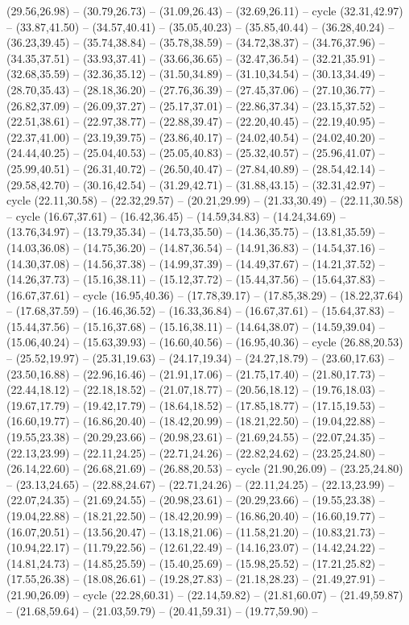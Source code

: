 {(29.56,26.98) -- (30.79,26.73) -- (31.09,26.43) -- (32.69,26.11) -- cycle (32.31,42.97) -- (33.87,41.50) -- (34.57,40.41) -- (35.05,40.23) -- (35.85,40.44) -- (36.28,40.24) -- (36.23,39.45) -- (35.74,38.84) -- (35.78,38.59) -- (34.72,38.37) -- (34.76,37.96) -- (34.35,37.51) -- (33.93,37.41) -- (33.66,36.65) -- (32.47,36.54) -- (32.21,35.91) -- (32.68,35.59) -- (32.36,35.12) -- (31.50,34.89) -- (31.10,34.54) -- (30.13,34.49) -- (28.70,35.43) -- (28.18,36.20) -- (27.76,36.39) -- (27.45,37.06) -- (27.10,36.77) -- (26.82,37.09) -- (26.09,37.27) -- (25.17,37.01) -- (22.86,37.34) -- (23.15,37.52) -- (22.51,38.61) -- (22.97,38.77) -- (22.88,39.47) -- (22.20,40.45) -- (22.19,40.95) -- (22.37,41.00) -- (23.19,39.75) -- (23.86,40.17) -- (24.02,40.54) -- (24.02,40.20) -- (24.44,40.25) -- (25.04,40.53) -- (25.05,40.83) -- (25.32,40.57) -- (25.96,41.07) -- (25.99,40.51) -- (26.31,40.72) -- (26.50,40.47) -- (27.84,40.89) -- (28.54,42.14) -- (29.58,42.70) -- (30.16,42.54) -- (31.29,42.71) -- (31.88,43.15) -- (32.31,42.97) -- cycle (22.11,30.58) -- (22.32,29.57) -- (20.21,29.99) -- (21.33,30.49) -- (22.11,30.58) -- cycle (16.67,37.61) -- (16.42,36.45) -- (14.59,34.83) -- (14.24,34.69) -- (13.76,34.97) -- (13.79,35.34) -- (14.73,35.50) -- (14.36,35.75) -- (13.81,35.59) -- (14.03,36.08) -- (14.75,36.20) -- (14.87,36.54) -- (14.91,36.83) -- (14.54,37.16) -- (14.30,37.08) -- (14.56,37.38) -- (14.99,37.39) -- (14.49,37.67) -- (14.21,37.52) -- (14.26,37.73) -- (15.16,38.11) -- (15.12,37.72) -- (15.44,37.56) -- (15.64,37.83) -- (16.67,37.61) -- cycle (16.95,40.36) -- (17.78,39.17) -- (17.85,38.29) -- (18.22,37.64) -- (17.68,37.59) -- (16.46,36.52) -- (16.33,36.84) -- (16.67,37.61) -- (15.64,37.83) -- (15.44,37.56) -- (15.16,37.68) -- (15.16,38.11) -- (14.64,38.07) -- (14.59,39.04) -- (15.06,40.24) -- (15.63,39.93) -- (16.60,40.56) -- (16.95,40.36) -- cycle (26.88,20.53) -- (25.52,19.97) -- (25.31,19.63) -- (24.17,19.34) -- (24.27,18.79) -- (23.60,17.63) -- (23.50,16.88) -- (22.96,16.46) -- (21.91,17.06) -- (21.75,17.40) -- (21.80,17.73) -- (22.44,18.12) -- (22.18,18.52) -- (21.07,18.77) -- (20.56,18.12) -- (19.76,18.03) -- (19.67,17.79) -- (19.42,17.79) -- (18.64,18.52) -- (17.85,18.77) -- (17.15,19.53) -- (16.60,19.77) -- (16.86,20.40) -- (18.42,20.99) -- (18.21,22.50) -- (19.04,22.88) -- (19.55,23.38) -- (20.29,23.66) -- (20.98,23.61) -- (21.69,24.55) -- (22.07,24.35) -- (22.13,23.99) -- (22.11,24.25) -- (22.71,24.26) -- (22.82,24.62) -- (23.25,24.80) -- (26.14,22.60) -- (26.68,21.69) -- (26.88,20.53) -- cycle (21.90,26.09) -- (23.25,24.80) -- (23.13,24.65) -- (22.88,24.67) -- (22.71,24.26) -- (22.11,24.25) -- (22.13,23.99) -- (22.07,24.35) -- (21.69,24.55) -- (20.98,23.61) -- (20.29,23.66) -- (19.55,23.38) -- (19.04,22.88) -- (18.21,22.50) -- (18.42,20.99) -- (16.86,20.40) -- (16.60,19.77) -- (16.07,20.51) -- (13.56,20.47) -- (13.18,21.06) -- (11.58,21.20) -- (10.83,21.73) -- (10.94,22.17) -- (11.79,22.56) -- (12.61,22.49) -- (14.16,23.07) -- (14.42,24.22) -- (14.81,24.73) -- (14.85,25.59) -- (15.40,25.69) -- (15.98,25.52) -- (17.21,25.82) -- (17.55,26.38) -- (18.08,26.61) -- (19.28,27.83) -- (21.18,28.23) -- (21.49,27.91) -- (21.90,26.09) -- cycle (22.28,60.31) -- (22.14,59.82) -- (21.81,60.07) -- (21.49,59.87) -- (21.68,59.64) -- (21.03,59.79) -- (20.41,59.31) -- (19.77,59.90) -- }
